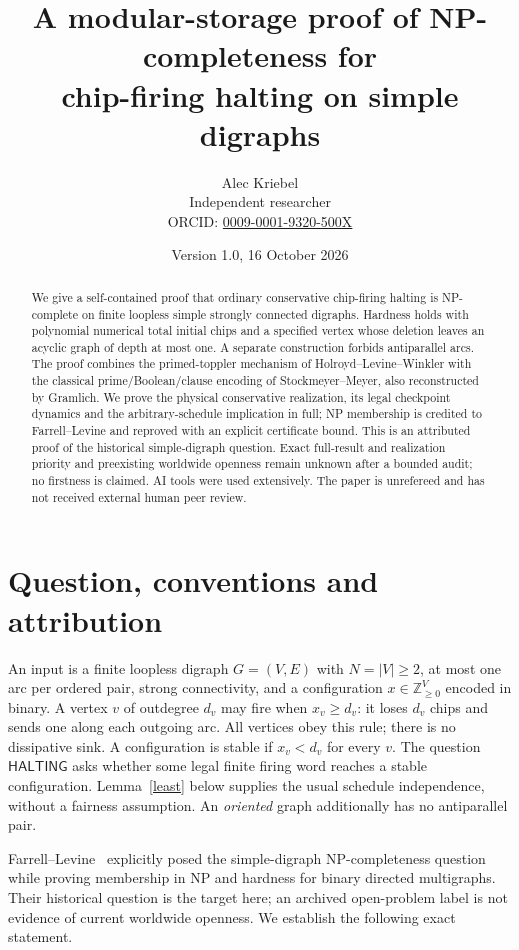 \documentclass[11pt]{article}
\title{A modular-storage proof of NP-completeness for\protect\\ chip-firing halting on simple digraphs}
\author{Alec Kriebel\\\small Independent researcher\\\small ORCID: \href{https://orcid.org/0009-0001-9320-500X}{0009-0001-9320-500X}}
\date{Version 1.0, 16 October 2026}
\newcommand{\Z}{\mathbb Z}
\newcommand{\HALT}{\mathsf{HALTING}}
\begin{document}
\maketitle
\begin{abstract}
We give a self-contained proof that ordinary conservative chip-firing halting
is NP-complete on finite loopless simple strongly connected digraphs.
Hardness holds with polynomial numerical total initial chips and a specified
vertex whose deletion leaves an acyclic graph of depth at most one. A separate
construction forbids antiparallel arcs. The proof combines the primed-toppler
mechanism of Holroyd--Levine--Winkler with the classical prime/Boolean/clause
encoding of Stockmeyer--Meyer, also reconstructed by Gramlich. We prove the
physical conservative realization, its legal checkpoint dynamics and the
arbitrary-schedule implication in full; NP membership is credited to
Farrell--Levine and reproved with an explicit certificate bound. This is an
attributed proof of the historical simple-digraph question. Exact full-result
and realization priority and preexisting worldwide openness remain unknown
after a bounded audit; no firstness is claimed. AI tools were used extensively.
The paper is unrefereed and has not received external human peer review.
\end{abstract}

\section{Question, conventions and attribution}
An input is a finite loopless digraph $G=(V,E)$ with $N=|V|\ge2$, at most one
arc per ordered pair, strong connectivity, and a configuration
$x\in\Z_{\ge0}^{V}$ encoded in binary. A vertex $v$ of outdegree $d_v$ may
fire when $x_v\ge d_v$: it loses $d_v$ chips and sends one along each outgoing
arc. All vertices obey this rule; there is no dissipative sink. A configuration
is stable if $x_v<d_v$ for every $v$. The question $\HALT$ asks whether some
legal finite firing word reaches a stable configuration. Lemma~\ref{least}
below supplies the usual schedule independence, without a fairness assumption.
An \emph{oriented} graph additionally has no antiparallel pair.

Farrell--Levine~\cite[\S3.1, Table~1]{FL} explicitly posed the simple-digraph
NP-completeness question while proving membership in NP and hardness for
binary directed multigraphs. Their historical question is the target here;
an archived open-problem label is not evidence of current worldwide openness.
We establish the following exact statement.
\end{document}
